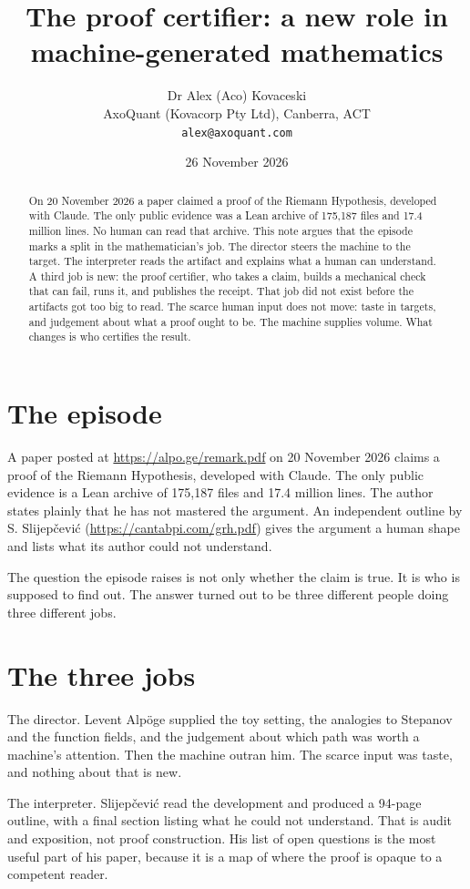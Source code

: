 \documentclass[11pt]{article}
\title{The proof certifier: a new role in machine-generated mathematics}
\author{Dr Alex (Aco) Kovaceski\\AxoQuant (Kovacorp Pty Ltd), Canberra, ACT\\\texttt{alex@axoquant.com}}
\date{26 November 2026}
\begin{document}
\maketitle

\begin{abstract}
On 20 November 2026 a paper claimed a proof of the Riemann Hypothesis, developed with Claude. The only public evidence was a Lean archive of 175,187 files and 17.4 million lines. No human can read that archive. This note argues that the episode marks a split in the mathematician's job. The director steers the machine to the target. The interpreter reads the artifact and explains what a human can understand. A third job is new: the proof certifier, who takes a claim, builds a mechanical check that can fail, runs it, and publishes the receipt. That job did not exist before the artifacts got too big to read. The scarce human input does not move: taste in targets, and judgement about what a proof ought to be. The machine supplies volume. What changes is who certifies the result.
\end{abstract}

\section{The episode}
A paper posted at \url{https://alpo.ge/remark.pdf} on 20 November 2026 claims a proof of the Riemann Hypothesis, developed with Claude. The only public evidence is a Lean archive of 175,187 files and 17.4 million lines. The author states plainly that he has not mastered the argument. An independent outline by S. Slijep\v{c}evi\'c (\url{https://cantabpi.com/grh.pdf}) gives the argument a human shape and lists what its author could not understand.

The question the episode raises is not only whether the claim is true. It is who is supposed to find out. The answer turned out to be three different people doing three different jobs.

\section{The three jobs}
The director. Levent Alp\"oge supplied the toy setting, the analogies to Stepanov and the function fields, and the judgement about which path was worth a machine's attention. Then the machine outran him. The scarce input was taste, and nothing about that is new.

The interpreter. Slijep\v{c}evi\'c read the development and produced a 94-page outline, with a final section listing what he could not understand. That is audit and exposition, not proof construction. His list of open questions is the most useful part of his paper, because it is a map of where the proof is opaque to a competent reader.
\end{document}

